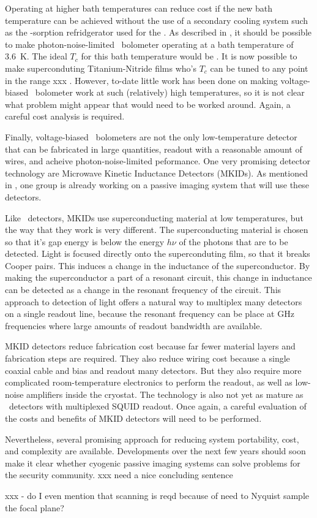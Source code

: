 Operating at higher bath temperatures can reduce cost if the new bath temperature can be achieved without the use of a secondary cooling system such as the -sorption refridgerator used for the \Imager.
As described in , it should be possible to make photon-noise-limited \TES\ bolometer operating at a bath temperature of \SI{3.6}{\K}.
The ideal $T_c$ for this bath temperature would be .
It is now possible to make superconduting Titanium-Nitride films who's $T_c$ can be tuned to any point in the range xxx \cite{xxx}.
However, to-date little work has been done on making voltage-biased \TES\ bolometer work at such (relatively) high temperatures, so it is not clear what problem might appear that would need to be worked around.
Again, a careful cost analysis is required.

Finally, voltage-biased \TES\ bolometers are not the only low-temperature detector that can be fabricated in large quantities, readout with a reasonable amount of wires, and acheive photon-noise-limited peformance.
One very promising detector technology are Microwave Kinetic Inductance Detectors (MKIDs).
As mentioned in , one group is already working on a passive imaging system that will use these detectors.

Like \TES\ detectors, MKIDs use superconducting material at low temperatures, but the way that they work is very different.
The superconducting material is chosen so that it's gap energy is below the energy $h \nu$ of the photons that are to be detected.
Light is focused directly onto the superconduting film, so that it breaks Cooper pairs.
This induces a change in the inductance of the superconductor.
By making the superconductor a part of a resonant circuit, this change in inductance can be detected as a change in the resonant frequency of the circuit.
This approach to detection of light offers a natural way to multiplex many detectors on a single readout line, because the resonant frequency can be place at GHz frequencies where large amounts of readout bandwidth are available.

MKID detectors reduce fabrication cost because far fewer material layers and fabrication steps are required.
They also reduce wiring cost because a single coaxial cable and bias and readout many detectors.
But they also require more complicated room-temperature electronics to perform the readout, as well as low-noise amplifiers inside the cryostat.
The technology is also not yet as mature as \TES\ detectors with multiplexed SQUID readout.
Once again, a careful evaluation of the costs and benefits of MKID detectors will need to be performed.

Nevertheless, several promising approach for reducing system portability, cost, and complexity are available.
Developments over the next few years should soon make it clear whether cyogenic passive imaging systems can solve problems for the security community.
xxx need a nice concluding sentence

xxx - do I even mention that scanning is reqd because of need to Nyquist sample the focal plane? 




